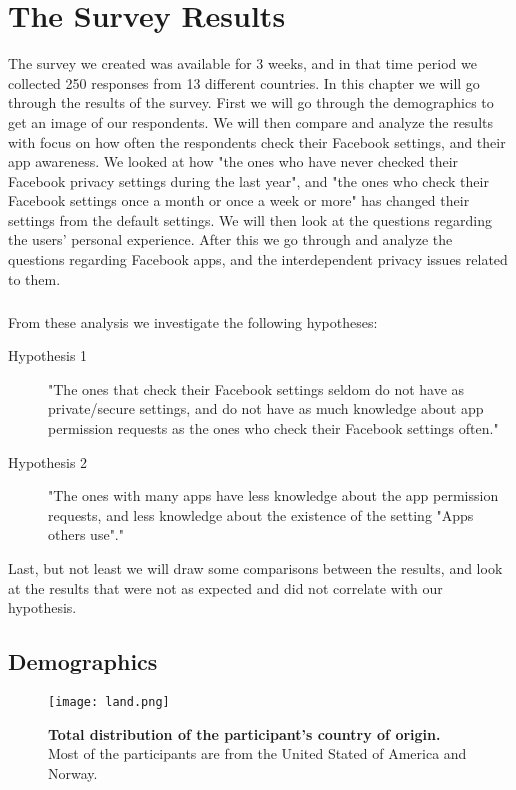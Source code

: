 \chapter{The Survey Results}
\label{chp:surveyresults} 

The survey we created was available for 3 weeks, and in that time period we collected 250 responses from 13 different countries. In this chapter we will go through the results of the survey. First we will go through the demographics to get an image of our respondents. We will then compare and analyze the results with focus on how often the respondents check their Facebook settings, and their app awareness. We looked at how "the ones who have never checked their Facebook privacy settings during the last year", and "the ones who check their Facebook settings once a month or once a week or more" has changed their settings from the default settings. We will then look at the questions regarding the users' personal experience. After this we go through and analyze the questions regarding Facebook apps, and the interdependent privacy issues related to them. 

\paragraph{}
From these analysis we investigate the following hypotheses: 
\begin{description}
\item [Hypothesis 1] "The ones that check their Facebook settings seldom do not have as private/secure settings, and do not have as much knowledge about app permission requests as the ones who check their Facebook settings often."
\item [Hypothesis 2] "The ones with many apps have less knowledge about the app permission requests, and less knowledge about the existence of the setting "Apps others use"."
\end{description}

Last, but not least we will draw some comparisons between the results, and look at the results that were not as expected and did not correlate with our hypothesis. 

\section{Demographics}

\begin{figure}[h!]
\centering
\texttt{[image: land.png]}
\caption[Total distribution of the participant's country of origin]{\textbf{Total distribution of the participant's country of origin.} Most of the participants are from the United Stated of America and Norway.} 
\label{fig:land}
\end{figure}


